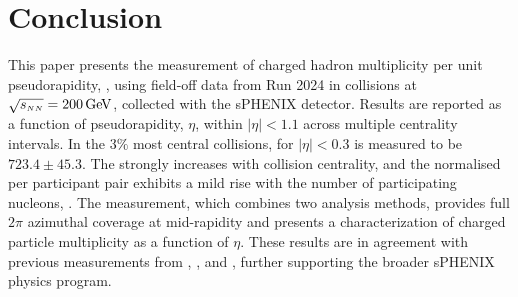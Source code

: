 \section{Conclusion}
This paper presents the measurement of charged hadron multiplicity per unit pseudorapidity, \dndeta, using field-off data from Run 2024 in \auau collisions at $\mbox{$\sqrt{s_{\scriptscriptstyle NN}}$}=200\mathrm{\,Ge\kern -0.1em V}$, collected with the sPHENIX detector. Results are reported as a function of pseudorapidity, $\eta$, within $|\eta|<1.1$ across multiple centrality intervals. In the $3\%$ most central collisions, \dndeta for $|\eta|<0.3$ is measured to be $723.4\pm45.3$. The \dndeta strongly increases with collision centrality, and the normalised \dndeta per participant pair exhibits a mild rise with the number of participating nucleons, \npart. 
The \sphenix measurement, which combines two analysis methods, provides full $2\pi$ azimuthal coverage at mid-rapidity and presents a characterization of charged particle multiplicity as a function of $\eta$. These results are in agreement with previous measurements from \phobos, \phenix, and \brahms, further supporting the broader sPHENIX physics program.


